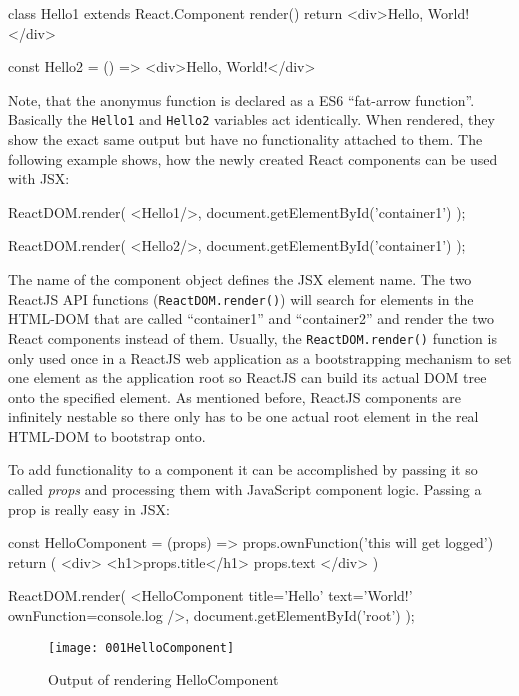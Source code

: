\begin{JsCode}
class Hello1 extends React.Component {
  render() {
  	return <div>Hello, World!</div>
  }
}

const Hello2 = () => <div>Hello, World!</div>
\end{JsCode}

Note, that the anonymus function is declared as a ES6 \enquote{fat-arrow function}. Basically the \texttt{Hello1} and \texttt{Hello2} variables act identically. When rendered, they show the exact same output but have no functionality attached to them. The following example shows, how the newly created React components can be used with JSX: \newline

\begin{JsCode}
ReactDOM.render(
  <Hello1/>,
  document.getElementById('container1')
);

ReactDOM.render(
  <Hello2/>,
  document.getElementById('container1')
);
\end{JsCode}

The name of the component object defines the JSX element name. The two ReactJS API functions (\texttt{ReactDOM.render()}) will search for elements in the HTML-DOM that are called \enquote{container1} and \enquote{container2} and render the two React components instead of them. Usually, the \texttt{ReactDOM.render()} function is only used once in a ReactJS web application as a bootstrapping mechanism to set one element as the application root so ReactJS can build its actual DOM tree onto the specified element. As mentioned before, ReactJS components are infinitely nestable so there only has to be one actual root element in the real HTML-DOM to bootstrap onto.

To add functionality to a component it can be accomplished by passing it so called \textit{props} and processing them with JavaScript component logic. Passing a prop is really easy in JSX:

\begin{JsCode}
const HelloComponent = (props) => {
  props.ownFunction('this will get logged')
	return (
 		<div>
    	<h1>{props.title}</h1>
      {props.text}
		</div>
  ) 
}

ReactDOM.render(
  <HelloComponent title='Hello' text='World!' ownFunction={console.log} />,
  document.getElementById('root')
);
\end{JsCode}

\begin{figure}
  \centering
  \texttt{[image: 001HelloComponent]}
  \caption{Output of rendering HelloComponent}
  \label{fig:HelloComponent}
\end{figure}

